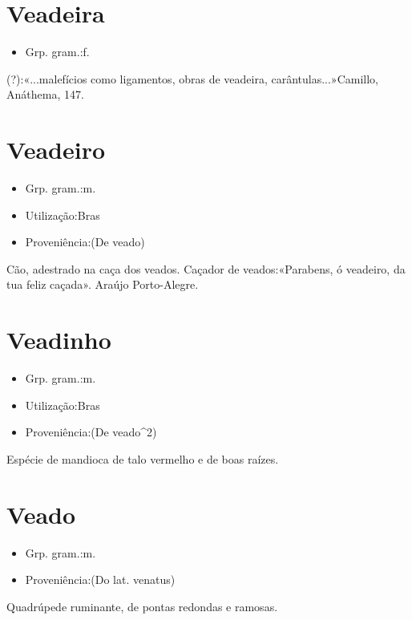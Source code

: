 \documentclass{article}
\begin{document}
\section{Veadeira}
\begin{itemize}
\item {Grp. gram.:f.}
\end{itemize}
(?):«\textunderscore ...malefícios como ligamentos, obras de veadeira, carântulas...\textunderscore »Camillo, \textunderscore Anáthema\textunderscore , 147.
\section{Veadeiro}
\begin{itemize}
\item {Grp. gram.:m.}
\end{itemize}
\begin{itemize}
\item {Utilização:Bras}
\end{itemize}
\begin{itemize}
\item {Proveniência:(De \textunderscore veado\textunderscore )}
\end{itemize}
Cão, adestrado na caça dos veados.
Caçador de veados:«\textunderscore Parabens, ó veadeiro, da tua feliz caçada\textunderscore ». Araújo Porto-Alegre.
\section{Veadinho}
\begin{itemize}
\item {Grp. gram.:m.}
\end{itemize}
\begin{itemize}
\item {Utilização:Bras}
\end{itemize}
\begin{itemize}
\item {Proveniência:(De \textunderscore veado\textunderscore ^2)}
\end{itemize}
Espécie de mandioca de talo vermelho e de boas raízes.
\section{Veado}
\begin{itemize}
\item {Grp. gram.:m.}
\end{itemize}
\begin{itemize}
\item {Proveniência:(Do lat. \textunderscore venatus\textunderscore )}
\end{itemize}
Quadrúpede ruminante, de pontas redondas e ramosas.
\end{document}
